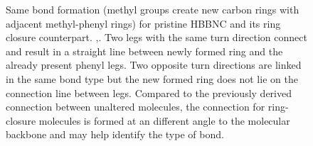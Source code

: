 \begin{figure}[] \centering
	\caption{Same bond formation (methyl groups create new carbon rings with adjacent methyl-phenyl rings) for  pristine HBBNC and its ring closure counterpart.
		,. 
	 Two legs with the same turn direction connect and result in a straight line between newly formed ring and the already present phenyl legs.
		 Two opposite turn directions are linked in the same bond type but the new formed ring does not lie on the connection line between legs.
	 Compared to the previously derived connection between unaltered molecules, the connection for ring-closure molecules is formed at an different angle to the molecular backbone and may help identify the type of bond.
	}
	\label{fig:HBBNC-ring-closure-motifs}
\end{figure}

